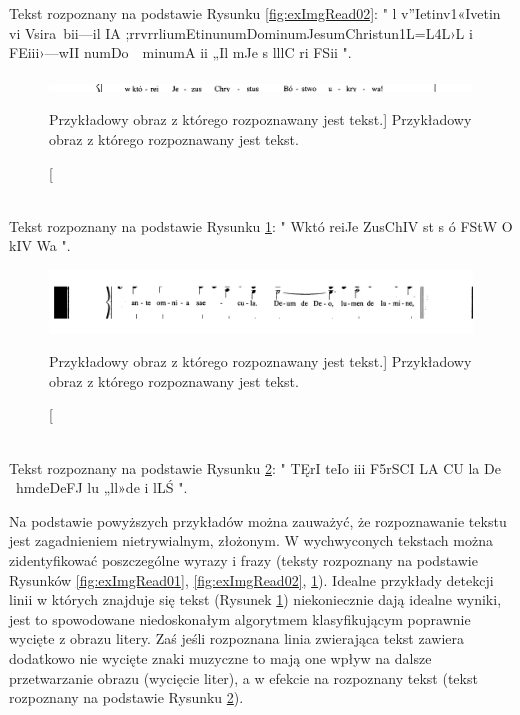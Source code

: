 \documentclass[a4paper,12pt]{article}
\begin{document}
	        Tekst rozpoznany na podstawie Rysunku \ref{fig:exImgRead02}: 
	        " l v”Ietinv1«Ivetin vi Vsira~bii—il IA  ;rrvrrliumEtinunumDominumJesumChristun1L=L4L›L  i   FEiii›—wII  numDo~~minumA ii „Il mJe s lllC ri FSii ".
	        \begin{figure}[!ht]  
			        \begin{center}
				        \includegraphics[width = 16.5cm, frame] {image//exampleImage//r_003.png} 
			        \end{center}
			        \caption
        			    [Przykładowy obraz z którego rozpoznawany jest tekst.]  
        			    {Przykładowy obraz z którego rozpoznawany jest tekst.}  
        			    \label{fig:exImgRead03}
	        \end{figure}\\
	        Tekst rozpoznany na podstawie Rysunku \ref{fig:exImgRead03}: 
	        " Wktó reiJe ZusChIV st s ó FStW O  kIV Wa   ".
	        \begin{figure}[!ht]  
			        \begin{center}
				        \includegraphics[width = 16.5cm, frame] {image//exampleImage//r_004.png} 
			        \end{center}
			        \caption
        			    [Przykładowy obraz z którego rozpoznawany jest tekst.]  
        			    {Przykładowy obraz z którego rozpoznawany jest tekst.}  
        			    \label{fig:exImgRead04}
	        \end{figure}\\
	        Tekst rozpoznany na podstawie Rysunku \ref{fig:exImgRead04}: 
	        "    TĘrI teIo   iii F5rSCI LA   CU la De   ~hmdeDeFJ   lu  „ll»de      i lLŚ     ".
	        
	        Na podstawie powyższych przykładów można zauważyć, że rozpoznawanie tekstu jest zagadnieniem nietrywialnym, złożonym. W wychwyconych tekstach można zidentyfikować poszczególne wyrazy i frazy (teksty rozpoznany na podstawie Rysunków \ref{fig:exImgRead01}, \ref{fig:exImgRead02}, \ref{fig:exImgRead03}). Idealne przykłady detekcji linii w których znajduje się tekst (Rysunek \ref{fig:exImgRead03}) niekoniecznie dają idealne wyniki, jest to spowodowane niedoskonałym algorytmem klasyfikującym poprawnie wycięte z obrazu litery. Zaś jeśli rozpoznana linia zwierająca tekst zawiera dodatkowo nie wycięte znaki muzyczne to mają one wpływ na dalsze przetwarzanie obrazu (wycięcie liter), a w efekcie na rozpoznany tekst (tekst rozpoznany na podstawie Rysunku \ref{fig:exImgRead04}).
	        
\end{document}
